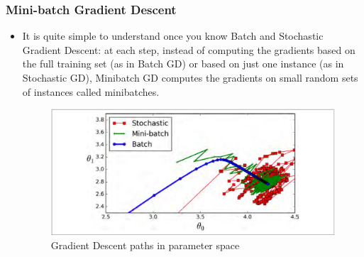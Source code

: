 \documentclass[11pt]{beamer}
\begin{document}
\begin{frame}
	\frametitle{Mini-batch Gradient Descent}
	\begin{itemize}
		\item 
		 It is quite simple to understand once you know Batch and Stochastic Gradient Descent: at each step, instead of computing the gradients based on the full training set (as in Batch GD) or based on just one instance (as in Stochastic GD), Minibatch GD computes the gradients on small random sets of instances called minibatches.
		\begin{figure}
			\centering
			\includegraphics[scale=0.29]{figure4-11}
			\caption{Gradient Descent paths in parameter space}
		\end{figure}		
	\end{itemize}
\end{frame}


\end{document}
